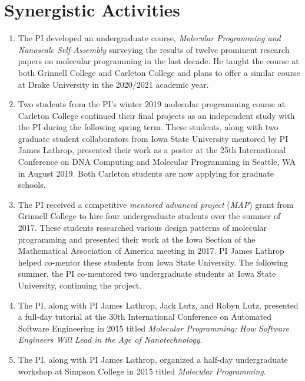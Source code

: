 \vspace*{-2ex}
\section*{Synergistic Activities}
\vspace*{-1ex}
\begin{enumerate}
    \item The PI developed an undergraduate course, \emph{Molecular Programming and Nanoscale Self-Assembly} surveying the results of twelve prominent research papers on molecular programming in the last decade.
    He taught the course at both Grinnell College and Carleton College and plans to offer a similar course at Drake University in the 2020/2021 academic year.
    \item Two students from the PI's winter 2019 molecular programming course at Carleton College continued their final projects as an independent study with the PI during the following spring term.
    These students, along with two graduate student collaborators from Iowa State University mentored by PI James Lathrop, presented their work as a poster at the 25th International Conference on DNA Computing and Molecular Programming in Seattle, WA in August 2019.
    Both Carleton students are now applying for graduate schools.
    \item The PI received a competitive \emph{mentored advanced project} (\emph{MAP}) grant from Grinnell College to hire four undergraduate students over the summer of 2017.
    These students researched various design patterns of molecular programming and presented their work at the Iowa Section of the Mathematical Association of America meeting in 2017.
    PI James Lathrop helped co-mentor these students from Iowa State University.
    The following summer, the PI co-mentored two undergraduate students at Iowa State University, continuing the project.
    \item The PI, along with PI James Lathrop, Jack Lutz, and Robyn Lutz, presented a full-day tutorial at the 30th International Conference on Automated Software Engineering in 2015 titled \emph{Molecular Programming: How Software Engineers Will Lead in the Age of Nanotechnology}.
    \item The PI, along with PI James Lathrop, organized a half-day undergraduate workshop at Simpson College in 2015 titled \emph{Molecular Programming}.

\end{enumerate}

